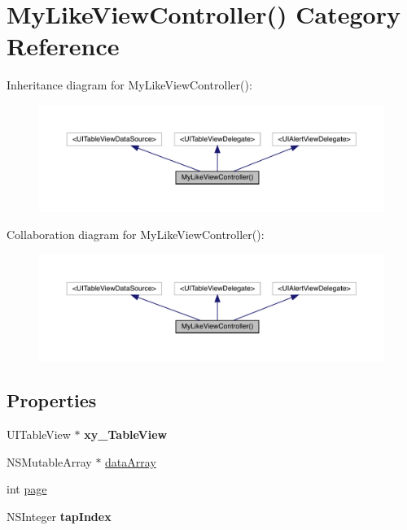 \hypertarget{category_my_like_view_controller_07_08}{}\section{My\+Like\+View\+Controller() Category Reference}
\label{category_my_like_view_controller_07_08}


Inheritance diagram for My\+Like\+View\+Controller()\+:\nopagebreak
\begin{figure}[H]
\begin{center}
\leavevmode
\includegraphics[width=350pt]{category_my_like_view_controller_07_08__inherit__graph}
\end{center}
\end{figure}


Collaboration diagram for My\+Like\+View\+Controller()\+:\nopagebreak
\begin{figure}[H]
\begin{center}
\leavevmode
\includegraphics[width=350pt]{category_my_like_view_controller_07_08__coll__graph}
\end{center}
\end{figure}
\subsection*{Properties}
\begin{DoxyCompactItemize}
\item 
\mbox{\label{category_my_like_view_controller_07_08_a20ee59205208b10ab59965da307260a1}} 
U\+I\+Table\+View $\ast$ {\bfseries xy\+\_\+\+Table\+View}
\item 
N\+S\+Mutable\+Array $\ast$ \mbox{\hyperlink{category_my_like_view_controller_07_08_ae67d4a400a58048f063eb61a319a743b}{data\+Array}}
\item 
int \mbox{\hyperlink{category_my_like_view_controller_07_08_a5adb553f5f8524abe1902e293fb7d64a}{page}}
\item 
\mbox{\label{category_my_like_view_controller_07_08_a0cf7b7a2fc3466110ee8b2bf6d35c441}} 
N\+S\+Integer {\bfseries tap\+Index}
\end{DoxyCompactItemize}


